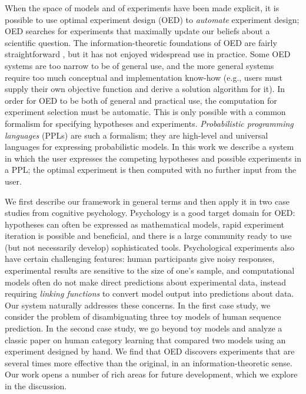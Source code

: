 \documentclass{article}
\begin{document}


When the space of models and of experiments have been made explicit, it is possible to use optimal experiment design (OED) to \emph{automate} experiment design; OED searches for experiments that maximally update our beliefs about a scientific question.
The information-theoretic foundations of OED are fairly straightforward \cite{Lindley1956}, but it has not enjoyed widespread use in practice.
Some OED systems are too narrow to be of general use, and %
the more general systems require too much conceptual and implementation know-how (e.g., users must supply their own objective function and derive a solution algorithm for it).
In order for OED to be both of general and practical use, the computation for experiment selection must be automatic.
This is only possible with a common formalism for specifying hypotheses and experiments.
\emph{Probabilistic programming languages} (PPLs) are such a formalism; they are high-level and universal languages for expressing probabilistic models.
In this work we describe a system in which the user expresses the competing hypotheses and possible experiments in a PPL; the optimal experiment is then computed with no further input from the user.

We first describe our framework in general terms and then apply it in two case studies from cognitive psychology.
Psychology is a good target domain for OED: hypotheses can often be expressed as mathematical models, rapid experiment iteration is possible and beneficial, and there is a large community ready to use (but not necessarily develop) sophisticated tools.
Psychological experiments also have certain challenging features: human participants give noisy responses, experimental results are sensitive to the size of one's sample, and computational models often do not make direct predictions about experimental data, instead requiring \emph{linking functions} to convert model output into predictions about data.
Our system naturally addresses these concerns.
In the first case study, we consider the problem of disambiguating three toy models of human sequence prediction.
In the second case study, we go beyond toy models and analyze a classic paper on human category learning that compared two models using an experiment designed by hand.
We find that OED discovers experiments that are several times more effective than the original, in an information-theoretic sense.
Our work opens a number of rich areas for future development, which we explore in the discussion.
\end{document}
